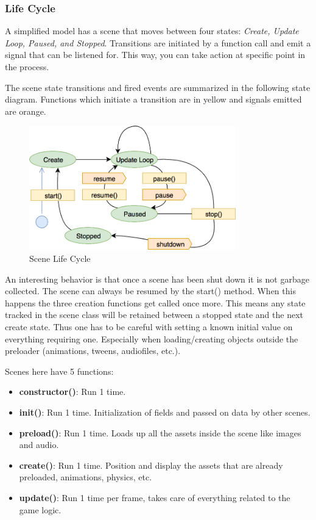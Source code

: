 \subsubsection{Life Cycle}
A simplified model has a scene that moves between four states: \textit{Create, Update Loop, Paused, and Stopped}.
Transitions are initiated by a function call and emit a signal that can be listened for.
This way, you can take action at specific point in the process.

The scene state transitions and fired events are summarized in the following state diagram.
Functions which initiate a transition are in yellow and signals emitted are orange.

\begin{figure}[H]
    \centering
    \includegraphics[width=0.8\textwidth]{figures/lifecycle}
    \caption{Scene Life Cycle\cite{phaser-guides-scenes}}
    \label{fig:lifecycle}
\end{figure}

An interesting behavior is that once a scene has been shut down it is not garbage collected.
The scene can always be resumed by the start() method.
When this happens the three creation functions get called once more.
This means any state tracked in the scene class will be retained between a stopped state and the next create state.
Thus one has to be careful with setting a known initial value on everything requiring one.
Especially when loading/creating objects outside the preloader (animations, tweens, audiofiles, etc.).

Scenes here have 5 functions:

\begin{itemize}
    \item \textbf{constructor()}: Run 1 time.
    \item \textbf{init()}: Run 1 time. Initialization of fields and passed on data by other scenes.
    \item \textbf{preload()}: Run 1 time. Loads up all the assets inside the scene like images and audio.
    \item \textbf{create()}: Run 1 time. Position and display the assets that are already preloaded, animations, physics, etc.
    \item \textbf{update()}: Run 1 time per frame, takes care of everything related to the game logic.
\end{itemize}

